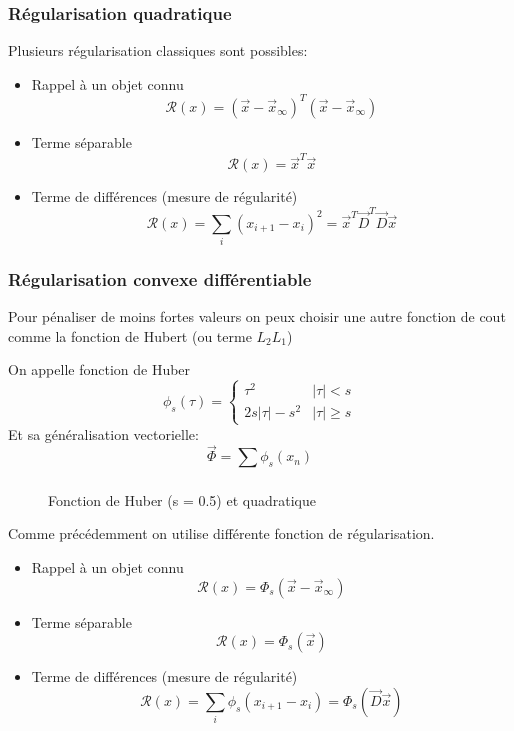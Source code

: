 \documentclass[main.tex]{subfiles}
\begin{document}
\subsubsection{Régularisation quadratique}
Plusieurs régularisation classiques sont possibles:

\begin{itemize}
\item Rappel à un objet connu
  \[
    \mathcal{R}(x) = (\vec{x}-\vec{x}_\infty)^T(\vec{x}-\vec{x}_\infty)
  \]
\item Terme séparable
  \[
    \mathcal{R}(x) = \vec{x}^T\vec{x}
  \]
\item Terme de différences (mesure de régularité)
  \[
    \mathcal{R}(x) = \sum_{i}^{}(x_{i+1}-x_i)^2 = \vec{x}^T\vec{D}^T\vec{D}\vec{x}
  \]
\end{itemize}

\subsubsection{Régularisation convexe différentiable}
Pour pénaliser de moins fortes valeurs on peux choisir une autre fonction de cout comme la fonction de Hubert (ou terme $L_2L_1$)
\begin{defin}
  On appelle fonction de Huber
\[\phi_s(\tau) =
  \begin{cases}
    \tau^2 & |\tau|< s \\
    2 s|\tau|-s^2 & |\tau| \ge s
  \end{cases}
\]
Et sa généralisation vectorielle:
\[
  \vec{\Phi} = \sum_{}^{}\phi_s(x_n)
\]
\end{defin}
\begin{figure}[H]
  \centering
  \caption{Fonction de Huber (s = 0.5) et quadratique}
\end{figure}
Comme précédemment on utilise différente fonction de régularisation.
\begin{itemize}
\item Rappel à un objet connu
  \[
    \mathcal{R}(x) = \Phi_s(\vec{x}-\vec{x}_\infty)
  \]
\item Terme séparable
  \[
    \mathcal{R}(x) = \Phi_s(\vec{x})
  \]
\item Terme de différences (mesure de régularité)
  \[
    \mathcal{R}(x) = \sum_{i}^{} \phi_s(x_{i+1}-x_i) = \Phi_s(\vec{D}\vec{x})
  \]
\end{itemize}
\end{document}

